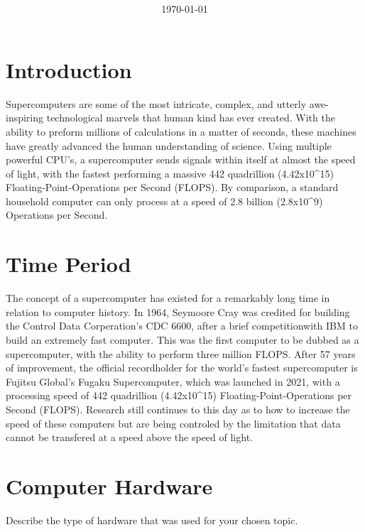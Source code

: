 \documentclass[11pt, twocolumn]{article}
\title{{\large } \thetitle}
\author{\theauthor}
\date{\today}
\begin{document}
\maketitle

\thispagestyle{firstpage}

\section{Introduction}
Supercomputers are some of the most intricate, complex, and utterly awe-inspiring technological marvels that human kind has ever created. With the ability to preform millions of calculations in a matter of seconds, these machines have greatly advanced the human understanding of science. Using multiple powerful CPU's, a supercomputer sends signals within itself at almost the speed of light, with the fastest performing a massive 442 quadrillion (4.42x10^15) Floating-Point-Operations per Second (FLOPS). By comparison, a standard household computer can only process at a speed of 2.8 billion (2.8x10^9) Operations per Second.

\section{Time Period}
The concept of a supercomputer has existed for a remarkably long time in relation to computer history. In 1964, Seymoore Cray was credited for building the Control Data Corperation's CDC 6600, after a brief competitionwith IBM to build an extremely fast computer. This was the first computer to be dubbed as a supercomputer, with the ability to perform three million FLOPS. After 57 years of improvement, the official recordholder for the world's fastest supercomputer is Fujitsu Global's Fugaku Supercomputer, which was launched in 2021, with a processing speed of 442 quadrillion (4.42x10^15) Floating-Point-Operations per Second (FLOPS). Research still continues to this day as to how to increase the speed of these computers but are being controled by the limitation that data cannot be transfered at a speed above the speed of light.

\section{Computer Hardware}
Describe the type of hardware that was used for your chosen topic.
\end{document}
